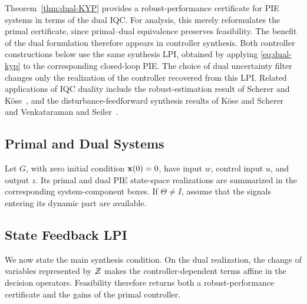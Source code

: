 Theorem~\ref{thm:dual-KYP} provides a robust-performance certificate for PIE
systems in terms of the dual IQC. For analysis, this merely reformulates the
primal certificate, since primal--dual equivalence preserves feasibility. The
benefit of the dual formulation therefore appears in controller
synthesis. Both controller constructions below use the same synthesis LPI,
obtained by applying \eqref{eq:dual-kyp} to the corresponding closed-loop
PIE. The choice of dual uncertainty filter changes only the realization of the
controller recovered from this LPI. Related applications of IQC duality
include the robust-estimation result of Scherer and
K\"ose~\cite{scherer2008robustness}, and the disturbance-feedforward synthesis
results of K\"ose and Scherer~\cite{kose2009robust} and Venkataraman and
Seiler~\cite{venkataraman}.

\dualcontrollerfigure

\subsection{Primal and Dual Systems}
Let $G$, with zero initial condition $\mathbf{x}(0)=0$, have input $w$,
control input $u$, and output $z$. Its primal and dual PIE state-space
realizations are summarized in the corresponding system-component boxes.
If $\Theta\neq I$, assume that the signals entering its dynamic part are
available.

\subsection{State Feedback LPI}

We now state the main synthesis condition. On the dual realization, the change
of variables represented by $\mathcal{Z}$ makes the controller-dependent terms
affine in the decision operators. Feasibility therefore returns both a
robust-performance certificate and the gains of the primal controller.





